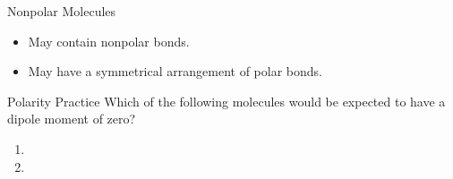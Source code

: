 \documentclass[notes=only]{beamer}
\begin{document}
\begin{frame}{Nonpolar Molecules}
	\begin{itemize}
		\item \alert{May} contain \alert{nonpolar} bonds.

			\begin{center}
				\hspace{5em}
			\end{center}

		\item \alert{May} have a symmetrical arrangement of polar bonds.

			\bigskip

			\begin{center}
				\hspace{5em}
			\end{center}
	\end{itemize}
\end{frame}

\begin{frame}[t]{Polarity Practice}
	Which of the following molecules would be expected to have a dipole
	moment of zero?

	\begin{enumerate}
		\item {}
		\item {}
	\end{enumerate}
	
	\vspace{8em}
\end{frame}

%
\end{document}
